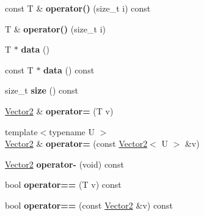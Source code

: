 \begin{DoxyCompactItemize}
\mbox{\label{struct_p_o_p_1_1_vector2_aaf8b70524e8bde74b260163a7037c16b}} 
const T \& {\bfseries operator()} (size\+\_\+t i) const
\item 
\mbox{\label{struct_p_o_p_1_1_vector2_a1cad01ccb52a8cf35352663a360006ea}} 
T \& {\bfseries operator()} (size\+\_\+t i)
\item 
\mbox{\label{struct_p_o_p_1_1_vector2_a0e8a54165d5d4208aab27788c9323aa3}} 
T $\ast$ {\bfseries data} ()
\item 
\mbox{\label{struct_p_o_p_1_1_vector2_a46e8504b4f3f110260c43035d206f280}} 
const T $\ast$ {\bfseries data} () const
\item 
\mbox{\label{struct_p_o_p_1_1_vector2_a5861ac8fbf5fcd0ab4ebaaec81be21c4}} 
size\+\_\+t {\bfseries size} () const
\item 
\mbox{\label{struct_p_o_p_1_1_vector2_a75ac55311be70f0f34d8b01d2a77a0ea}} 
\mbox{\hyperlink{struct_p_o_p_1_1_vector2}{Vector2}} \& {\bfseries operator=} (T v)
\item 
\mbox{\label{struct_p_o_p_1_1_vector2_a927cb8f2968086d71ae190f532e19bd9}} 
{\footnotesize template$<$typename U $>$ }\\\mbox{\hyperlink{struct_p_o_p_1_1_vector2}{Vector2}} \& {\bfseries operator=} (const \mbox{\hyperlink{struct_p_o_p_1_1_vector2}{Vector2}}$<$ U $>$ \&v)
\item 
\mbox{\label{struct_p_o_p_1_1_vector2_a09ce7162d7b43260623a1273b66ec56b}} 
\mbox{\hyperlink{struct_p_o_p_1_1_vector2}{Vector2}} {\bfseries operator-\/} (void) const
\item 
\mbox{\label{struct_p_o_p_1_1_vector2_a882e53f7f09356e6afc3f85a6233e26e}} 
bool {\bfseries operator==} (T v) const
\item 
\mbox{\label{struct_p_o_p_1_1_vector2_acaa866ee7a6c903173bdb373ec6f7135}} 
bool {\bfseries operator==} (const \mbox{\hyperlink{struct_p_o_p_1_1_vector2}{Vector2}} \&v) const

\end{DoxyCompactItemize}
